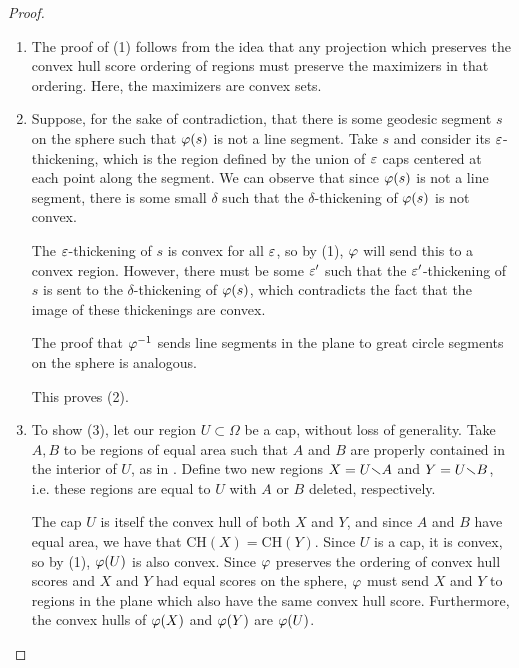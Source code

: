 \begin{proof}
	\ \\
	
	\vspace*{-2em}
	\begin{enumerate}
		\item[] The proof of (1) follows from the idea that any projection which preserves the convex hull score ordering of regions must 
		preserve the maximizers in that ordering.   Here, the maximizers are convex sets.
		
		\item[]  Suppose, for the sake of contradiction, that there is some geodesic segment $s$ on the sphere such that $\varphi(s)$ is not a line segment. Take $s$ and 
		consider its $\varepsilon$-thickening, which is the region defined by the union of $\varepsilon$ caps centered at each point 
		along the segment.  We can observe that since $\varphi(s)$ is not a line segment, there is some small $\delta$ such that the $\delta$-thickening of $\varphi(s)$ is not convex.  
		
		The $\varepsilon$-thickening of $s$ is convex for all $\varepsilon$, so by (1), $\varphi$ will send this to a convex region.  However, there must be some $\varepsilon'$ such that the $\varepsilon'$-thickening of $s$ is sent to the $\delta$-thickening of $\varphi(s)$, which contradicts the fact that the image of these thickenings are convex.
		
		The proof that $\varphi^{-1}$ sends line segments in the plane to great circle segments on the sphere is analogous.  
		
		This proves (2).
		
		
		
\item[] To show (3), let our region $U\subset\Omega$ be a cap, without loss of generality.  Take $A,B$ to be regions of equal area such that $A$ and $B$ are properly contained in the interior of $U$, as in .  Define two new regions $X=U{\smallsetminus} A$ and $Y=U{\smallsetminus} B$, i.e. these regions are equal to $U$ with $A$ or $B$ deleted, respectively.  

The cap $U$ is itself the convex hull of both $X$ and $Y$, and since $A$ and $B$ have equal area, we have that $\mathrm{CH}(X) = \mathrm{CH}(Y)$.  Since $U$ is a cap, it is convex, so by (1), $\varphi(U)$ is also convex.  Since $\varphi$ preserves the ordering of convex hull scores and $X$ and $Y$ had equal scores on the sphere, $\varphi$ must send $X$ and $Y$ to regions in the plane which also have the same convex hull score.  Furthermore, the convex hulls of $\varphi(X)$ and $\varphi(Y)$ are $\varphi(U)$.


\end{enumerate}
\end{proof}
